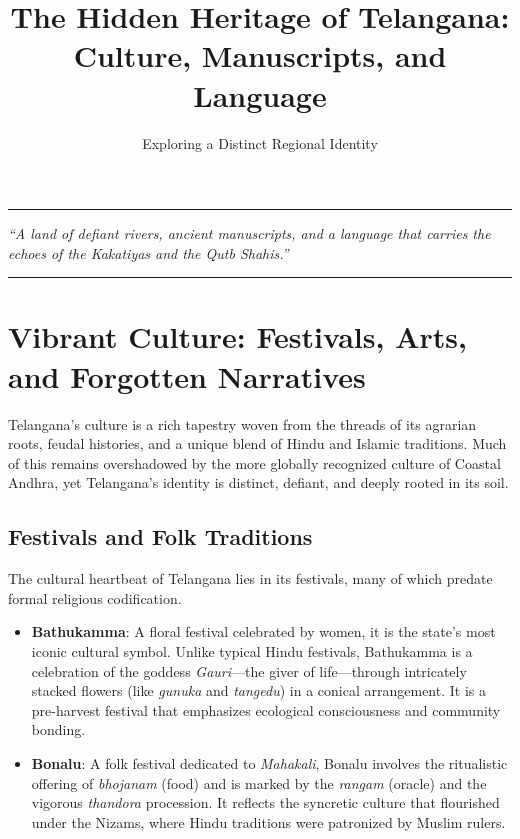 \documentclass[12pt]{article}
\begin{document}
\title{\textbf{The Hidden Heritage of Telangana: Culture, Manuscripts, and Language}}
\author{Exploring a Distinct Regional Identity}
\date{}
\maketitle

\begin{center}
    \rule{0.9\textwidth}{0.5pt}
    \textit{“A land of defiant rivers, ancient manuscripts, and a language that carries the echoes of the Kakatiyas and the Qutb Shahis.”}
    \rule{0.9\textwidth}{0.5pt}
\end{center}

\section{Vibrant Culture: Festivals, Arts, and Forgotten Narratives}
Telangana’s culture is a rich tapestry woven from the threads of its agrarian roots, feudal histories, and a unique blend of Hindu and Islamic traditions. Much of this remains overshadowed by the more globally recognized culture of Coastal Andhra, yet Telangana’s identity is distinct, defiant, and deeply rooted in its soil.

\subsection{Festivals and Folk Traditions}
The cultural heartbeat of Telangana lies in its festivals, many of which predate formal religious codification. 
\begin{itemize}
    \item \textbf{Bathukamma}: A floral festival celebrated by women, it is the state’s most iconic cultural symbol. Unlike typical Hindu festivals, Bathukamma is a celebration of the goddess \textit{Gauri}—the giver of life—through intricately stacked flowers (like \textit{gunuka} and \textit{tangedu}) in a conical arrangement. It is a pre-harvest festival that emphasizes ecological consciousness and community bonding. \cite{bathukamma}
    \item \textbf{Bonalu}: A folk festival dedicated to \textit{Mahakali}, Bonalu involves the ritualistic offering of \textit{bhojanam} (food) and is marked by the \textit{rangam} (oracle) and the vigorous \textit{thandora} procession. It reflects the syncretic culture that flourished under the Nizams, where Hindu traditions were patronized by Muslim rulers. \cite{bonalu}
\end{itemize}
\end{document}
